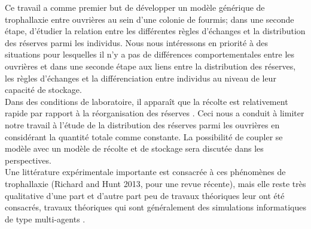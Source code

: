 Ce travail a comme premier but de développer un modèle générique de trophallaxie entre ouvrières au sein d'une colonie de fourmis; dans une seconde étape, d'étudier la relation entre les différentes règles d'échanges et la distribution des réserves parmi les individus. Nous nous intéressons en priorité à des situations pour lesquelles il n'y a pas de différences comportementales entre les ouvrières et dans une seconde étape aux liens entre la distribution des réserves, les règles d'échanges et la différenciation entre individus au niveau de leur capacité de stockage.\\

Dans des conditions de laboratoire, il apparaît que la récolte est relativement rapide par rapport à la réorganisation des réserves  \citep{buffin_feeding_2009,buffin_collective_2012}. Ceci nous a conduit à limiter notre travail à l'étude de la distribution des réserves parmi les ouvrières en considérant la quantité totale comme constante. La possibilité de coupler se modèle avec un modèle de récolte et de stockage sera discutée dans les perspectives.\\

Une littérature expérimentale importante est consacrée à ces phénomènes de trophallaxie (Richard and Hunt 2013, pour une revue récente), mais elle reste très qualitative d'une part et d'autre part peu de travaux théoriques leur ont été consacrés, travaux théoriques qui sont généralement des simulations informatiques de type multi-agents \citep{schmickl_trophallaxis_2007}.

%
%
%

